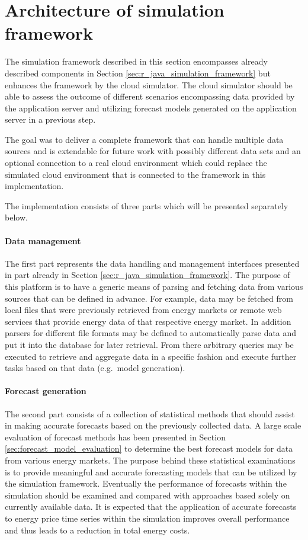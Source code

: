 



\section{Architecture of simulation framework} \label{sec:architecture_of_simulation_framework}


The simulation framework described in this section encompasses already described components in Section \ref{sec:r_java_simulation_framework} but enhances the framework by the cloud simulator. The cloud simulator should be able to assess the outcome of different scenarios encompassing data provided by the application server and utilizing forecast models generated on the application server in a previous step. 

The goal was to deliver a complete framework that can handle multiple data sources and is extendable for future work with possibly different data sets and an optional connection to a real cloud environment which could replace the simulated cloud environment that is connected to the framework in this implementation. 

The implementation consists of three parts which will be presented separately below. 

\paragraph{Data management} The first part represents the data handling and management interfaces presented in part already in Section \ref{sec:r_java_simulation_framework}. The purpose of this platform is to have a generic means of parsing and fetching data from various sources that can be defined in advance. For example, data may be fetched from local files that were previously retrieved from energy markets or remote web services that provide energy data of that respective energy market. In addition parsers for different file formats may be defined to automatically parse data and put it into the database for later retrieval. From there arbitrary queries may be executed to retrieve and aggregate data in a specific fashion and execute further tasks based on that data (e.g.~model generation). 

\paragraph{Forecast generation}
The second part consists of a collection of statistical methods that should assist in making accurate forecasts based on the previously collected data. A large scale evaluation of forecast methods has been presented in Section \ref{sec:forecast_model_evaluation} to determine the best forecast models for data from various energy markets. 
The purpose behind these statistical examinations is to provide meaningful and accurate forecasting models that can be utilized by the simulation framework. Eventually the performance of forecasts within the simulation should be examined and compared with approaches based solely on currently available data. It is expected that the application of accurate forecasts to energy price time series within the simulation improves overall performance and thus leads to a reduction in total energy costs. 

